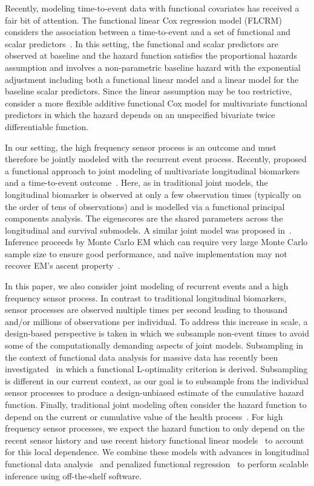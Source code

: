\documentclass[12pt]{amsart}
\begin{document}
Recently, modeling time-to-event data with functional covariates has received a fair bit of attention.  The functional linear Cox regression model (FLCRM) considers the association between a time-to-event and a set of functional and scalar predictors~\citep{https://doi.org/10.1111/biom.12748}. In this setting, the functional and scalar predictors are observed at baseline and the hazard function satisfies the proportional hazards assumption and involves a non-parametric baseline hazard with the exponential adjustment including both a functional linear model and a linear model for the baseline scalar predictors.
Since the linear assumption may be too restrictive,~\cite{doi:10.1080/10618600.2020.1853550} consider a more flexible additive functional Cox model for multivariate functional predictors in which the hazard depends on an unspecified bivariate twice differentiable function.

In our setting, the high frequency sensor process is an outcome and must therefore be jointly modeled with the recurrent event process.  Recently, \cite{Li2022} proposed a functional approach to joint modeling of multivariate longitudinal biomarkers and a time-to-event outcome~\citep{Tsiatis2004,Rizopoulos2010}.  Here, as in traditional joint models, the longitudinal biomarker is observed at only a few observation times (typically on the order of tens of observations) and is modelled via a functional principal components analysis.  The eigenscores are the shared parameters across the longitudinal and survival submodels.  A similar joint model was proposed in~\cite{Dong2021}.  Inference proceeds by Monte Carlo EM which can require very large Monte Carlo sample size to ensure good performance, and na{\"i}ve implementation may not recover EM's ascent property~\citep{Caffo2005}.

In this paper, we also consider joint modeling of recurrent events and a high frequency sensor process. In contrast to traditional longitudinal biomarkers, sensor processes are observed multiple times per second leading to thousand and/or millions of observations per individual.  To address this increase in scale, a design-based perspective is taken in which we subsample non-event times to avoid some of the computationally demanding aspects of joint models.  Subsampling in the context of functional data analysis for massive data has recently been investigated~\citep{https://doi.org/10.48550/arxiv.2104.03446} in which a functional L-optimality criterion is derived. Subsampling is different in our current context, as our goal is to subsample from the individual sensor processes to produce a design-unbiased estimate of the cumulative hazard function.  Finally, traditional joint modeling often consider the hazard function to depend on the current or cumulative value of the health process~\citep{Li2022,Rizopoulos2010}. For high frequency sensor processes, we expect the hazard function to only depend on the recent sensor history and use recent history functional linear models~\citep{KIM20111554} to account for this local dependence.  We combine these models with advances in longitudinal functional data analysis~\citep{Staicu2010} and penalized functional regression~\citep{Goldsmith2015} to perform scalable inference using off-the-shelf software.
\end{document}
